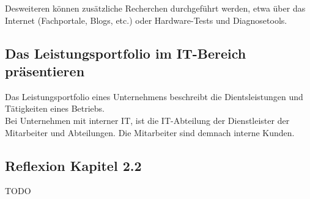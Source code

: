     \begin{subindent}
        Desweiteren können zusätzliche Recherchen durchgeführt werden, etwa über das Internet (Fachportale, Blogs, etc.) oder Hardware-Tests und Diagnosetools.
    
    \end{subindent}

\subsection{Das Leistungsportfolio im IT-Bereich präsentieren}
    \begin{subindent}
        Das Leistungsportfolio eines Unternehmens beschreibt die Dientsleistungen und Tätigkeiten eines Betriebs. \\
        Bei Unternehmen mit interner IT, ist die IT-Abteilung der Dienstleister der Mitarbeiter und Abteilungen. Die Mitarbeiter sind demnach interne Kunden.
    \end{subindent}

\subsection*{Reflexion Kapitel 2.2}
    \begin{refindent}
        TODO
    \end{refindent}